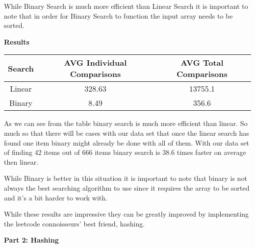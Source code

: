 \documentclass[12pt,letterpaper, onecolumn]{exam}
\begin{document}
\vspace{.5cm}
\centering While Binary Search is much more efficient than Linear Search it is important to note that in order for Binary Search to function the input array needs to be sorted.

\newpage

\centering \textbf{Results}

\vspace{1.5cm}


\begin{tabular}{|c|c|c|}
    \hline
          \textbf{Search} & \textbf{AVG Individual Comparisons} & \textbf{AVG Total Comparisons} \\
          \hline
         Linear  & 328.63 & 13755.1 \\
         Binary  & 8.49 & 356.6 \\
         
    \hline
    \end{tabular}

\vspace{.8cm}

\centering As we can see from the table binary search is much more efficient than linear. So much so that there will be cases with our data set that once the linear search has found one item binary might already be done with all of them. With our data set of finding 42 items out of 666 items binary search is 38.6 times faster on average then linear. 

\vspace{.4cm}

\centering While Binary is better in this situation it is important to note that binary is not always the best searching algorithm to use since it requires the array to be sorted and it's a bit harder to work with. 

\vspace{2cm}

\centering While these results are impressive they can be greatly improved by implementing the leetcode connoisseurs' best friend, hashing.

\newpage

\centering \textbf{Part 2: Hashing}
\end{document}
